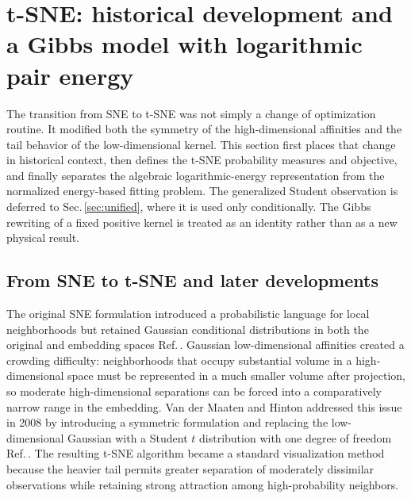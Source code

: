 \documentclass[11pt,a4paper]{article}
\theoremstyle{definition}
\theoremstyle{plain}
\begin{document}
\section{t-SNE: historical development and a Gibbs model with logarithmic pair energy}
\label{sec:tsne}

The transition from SNE to t-SNE was not simply a change of optimization routine. It modified both the symmetry of the high-dimensional affinities and the tail behavior of the low-dimensional kernel. This section first places that change in historical context, then defines the t-SNE probability measures and objective, and finally separates the algebraic logarithmic-energy representation from the normalized energy-based fitting problem. The generalized Student observation is deferred to Sec.\,\ref{sec:unified}, where it is used only conditionally. The Gibbs rewriting of a fixed positive kernel is treated as an identity rather than as a new physical result.

\subsection{From SNE to t-SNE and later developments}
\label{subsec:tsne_history}

The original SNE formulation introduced a probabilistic language for local neighborhoods but retained Gaussian conditional distributions in both the original and embedding spaces Ref.\,\cite{hinton2002sne}. Gaussian low-dimensional affinities created a crowding difficulty: neighborhoods that occupy substantial volume in a high-dimensional space must be represented in a much smaller volume after projection, so moderate high-dimensional separations can be forced into a comparatively narrow range in the embedding. Van der Maaten and Hinton addressed this issue in 2008 by introducing a symmetric formulation and replacing the low-dimensional Gaussian with a Student $t$ distribution with one degree of freedom Ref.\,\cite{vandermaaten2008tsne}. The resulting t-SNE algorithm became a standard visualization method because the heavier tail permits greater separation of moderately dissimilar observations while retaining strong attraction among high-probability neighbors.
\end{document}
